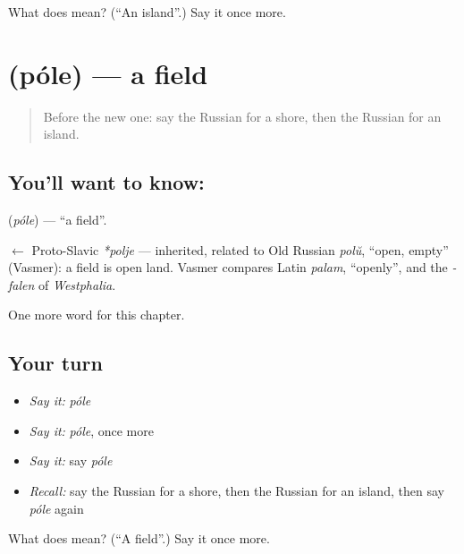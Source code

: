 \begin{tcolorbox}[breakable,colback=teal!4,colframe=teal!35!black,title={Before you move on}]
What does  mean? (\textquotedblleft{}An island\textquotedblright{}.) Say it once more.
\end{tcolorbox}
\section[\texorpdfstring{\ru{поле} (póle)}{поле (póle)}]{ (póle) — a field}

\label{lesson:RU-C57-field}



\begin{quote}
Before the new one: say the Russian for a shore, then the Russian for an island.
\end{quote}

\subsection*{You'll want to know: }
\textbf{} (\emph{póle}) — \textquotedblleft{}a field\textquotedblright{}.

\begin{cousinweb}
\textbf{} $\leftarrow$ Proto-Slavic \emph{*polje} — inherited, related to Old Russian \emph{polŭ}, \textquotedblleft{}open, empty\textquotedblright{} (Vasmer): a field is open land. Vasmer compares Latin \emph{palam}, \textquotedblleft{}openly\textquotedblright{}, and the \emph{-falen} of \emph{Westphalia}.
\end{cousinweb}

\begin{grammarlens}[title={What you've built}]
One more word for this chapter.
\end{grammarlens}

\subsection*{Your turn}
\begin{itemize}
\raggedright
  \item \emph{Say it:} \emph{póle}
  \item \emph{Say it:} \emph{póle}, once more
  \item \emph{Say it:} say \emph{póle}
  \item \emph{Recall:} say the Russian for a shore, then the Russian for an island, then say \emph{póle} again
\end{itemize}

\begin{tcolorbox}[breakable,colback=teal!4,colframe=teal!35!black,title={Before you move on}]
What does  mean? (\textquotedblleft{}A field\textquotedblright{}.) Say it once more.
\end{tcolorbox}
